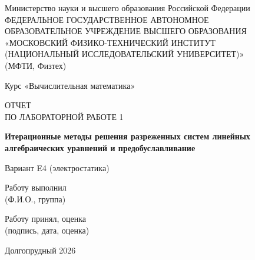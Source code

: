 \documentclass[12pt]{article}
\begin{document}
\thispagestyle{empty}

\begin{center}

\large
Министерство науки и высшего образования Российской Федерации \\
\large
ФЕДЕРАЛЬНОЕ ГОСУДАРСТВЕННОЕ АВТОНОМНОЕ \\
ОБРАЗОВАТЕЛЬНОЕ УЧРЕЖДЕНИЕ ВЫСШЕГО ОБРАЗОВАНИЯ \\
\large
«МОСКОВСКИЙ ФИЗИКО-ТЕХНИЧЕСКИЙ ИНСТИТУТ \\
(НАЦИОНАЛЬНЫЙ ИССЛЕДОВАТЕЛЬСКИЙ УНИВЕРСИТЕТ)» \\
(МФТИ, Физтех)

\vspace{2.5cm}



\large
Курс «Вычислительная математика»

\vspace{0.5cm}

\Large
ОТЧЕТ \\
ПО ЛАБОРАТОРНОЙ РАБОТЕ 1

\vspace{0.7cm}

\Large
\textbf{Итерационные методы решения разреженных систем линейных алгебраических уравнений и предобуславливание}

\vspace{0.5cm}

\large
Вариант E4 (электростатика)

\vfill

\vspace{1.5cm}

\large

\noindent
Работу выполнил \hfill  \underline{\hspace{4.2cm}} \\
\hfill {\hspace{1.6cm} (Ф.И.О., группа)}\par

\vspace{2.5cm}

\noindent
Работу принял, оценка \hfill \underline{\hspace{6cm}} \\
\hfill {\small (подпись, дата, оценка)}

\vfill

Долгопрудный 2026

\end{center}
\end{document}
